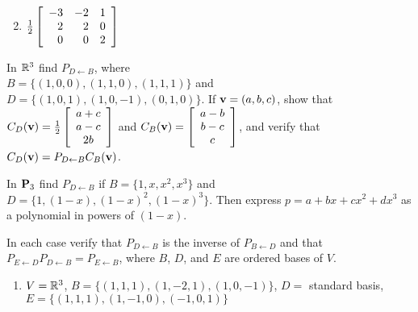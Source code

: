 \begin{multicols}{2}
\begin{ex}
\begin{enumerate}[label={\alph*.}]
\end{enumerate}
\begin{sol}
\begin{enumerate}[label={\alph*.}]
\setcounter{enumi}{1}
\item $\tfrac{1}{2} \left[ \begin{array}{rrr} -3 & -2 & 1 \\ 2 & 2 & 0 \\ 0 & 0 & 2 \end{array} \right]$


\end{enumerate}
\end{sol}
\end{ex}

\begin{ex}
In $\mathbb{R}^3$ find $P_{D \gets B}$, where \\ $B = \{(1, 0, 0), (1, 1, 0), (1, 1, 1)\}$ and \\ $D = \{(1, 0, 1), (1, 0, -1), (0, 1, 0)\}$. If $\textbf{v} = (a, b, c)$, show that $C_D(\textbf{v}) = \tfrac{1}{2} \left[ \begin{array}{c} a + c \\ a - c \\ 2b \end{array} \right]$ and $C_B(\textbf{v}) = \left[ \begin{array}{c} a - b \\ b - c \\ c \end{array} \right]$, and verify that $C_{D}(\textbf{v}) = P_{D \gets B}C_{B}(\textbf{v})$.
\end{ex}

\begin{ex}
In $\textbf{P}_{3}$ find $P_{D \gets B}$ if $B = \{1, x, x^{2}, x^{3}\}$ and $D = \{1, (1 - x), (1 - x)^{2}, (1 - x)^{3}\}$. Then express $p = a + bx + cx^{2} + dx^{3}$ as a polynomial in powers of $(1 - x)$.
\end{ex}

\begin{ex}
In each case verify that $P_{D \gets B}$ is the inverse of $P_{B \gets D}$ and that $P_{E \gets D}P_{D \gets B} = P_{E \gets B}$, where $B$, $D$, and $E$ are ordered bases of $V$.


\begin{enumerate}[label={\alph*.}]
\item $V = \mathbb{R}^3$, $B = \{(1, 1, 1), (1, -2, 1), (1, 0, -1)\}$, $D =$ standard basis, \\ $E = \{(1, 1, 1), (1, -1, 0), (-1, 0, 1)\}$



\end{enumerate}
\end{ex}
\end{multicols}
